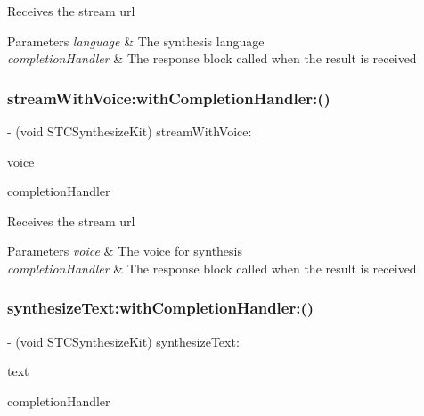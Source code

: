 Receives the stream url 
\begin{DoxyParams}{Parameters}
{\em language} & The synthesis language \\
\hline
{\em completion\+Handler} & The response block called when the result is received \\
\hline
\end{DoxyParams}
\hypertarget{protocol_s_t_c_synthesize_kit_01-p_a979b7ce63513807b589cf3832a985aad}{}\label{protocol_s_t_c_synthesize_kit_01-p_a979b7ce63513807b589cf3832a985aad} 
\subsubsection{\texorpdfstring{stream\+With\+Voice\+:with\+Completion\+Handler\+:()}{streamWithVoice:withCompletionHandler:()}}
{\footnotesize\ttfamily -\/ (void S\+T\+C\+Synthesize\+Kit) stream\+With\+Voice\+: \begin{DoxyParamCaption}\item[{(N\+S\+String $\ast$)}]{voice }\item[{withCompletionHandler:(Stream\+Completion\+Handler)}]{completion\+Handler }\end{DoxyParamCaption}}

Receives the stream url 
\begin{DoxyParams}{Parameters}
{\em voice} & The voice for synthesis \\
\hline
{\em completion\+Handler} & The response block called when the result is received \\
\hline
\end{DoxyParams}
\hypertarget{protocol_s_t_c_synthesize_kit_01-p_a2257422be5b0fbb23cf7375230f37b77}{}\label{protocol_s_t_c_synthesize_kit_01-p_a2257422be5b0fbb23cf7375230f37b77} 
\subsubsection{\texorpdfstring{synthesize\+Text\+:with\+Completion\+Handler\+:()}{synthesizeText:withCompletionHandler:()}}
{\footnotesize\ttfamily -\/ (void S\+T\+C\+Synthesize\+Kit) synthesize\+Text\+: \begin{DoxyParamCaption}\item[{(N\+S\+String $\ast$)}]{text }\item[{withCompletionHandler:(Synthesize\+Completion\+Handler)}]{completion\+Handler }\end{DoxyParamCaption}}

